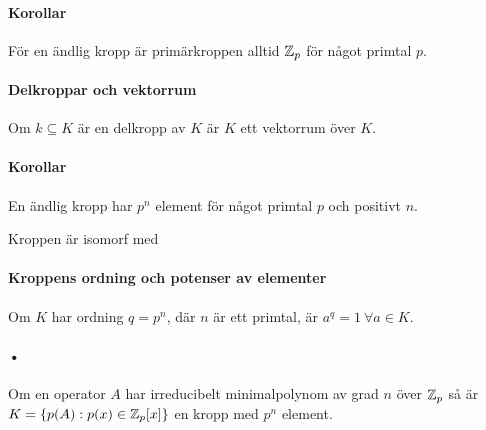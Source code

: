 \paragraph{Korollar}
För en ändlig kropp är primärkroppen alltid $\mathbb{Z}_{p}$ för något primtal $p$.

\proof

\paragraph{Delkroppar och vektorrum}
Om $k\subseteq K$ är en delkropp av $K$ är $K$ ett vektorrum över $K$.

\proof

\paragraph{Korollar}
En ändlig kropp har $p^{n}$ element för något primtal $p$ och positivt $n$.

\proof
Kroppen är isomorf med 

\paragraph{Kroppens ordning och potenser av elementer}
Om $K$ har ordning $q = p^{n}$, där $n$ är ett primtal, är $a^{q} = 1\ \forall a\in K$.

\proof

\paragraph{•}
Om en operator $A$ har irreducibelt minimalpolynom av grad $n$ över $\mathbb{Z}_{p}$ så är $K = \{p(A): p(x)\in\mathbb{Z}_{p}[x]\}$ en kropp med $p^{n}$ element.

\proof